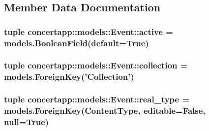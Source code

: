 \subsection{Member Data Documentation}
\hypertarget{classconcertapp_1_1models_1_1_event_a6d8e5e726942e88d3380d90d1aff01a1}{
\subsubsection[{active}]{\setlength{\rightskip}{0pt plus 5cm}tuple {\bf concertapp::models::Event::active} = models.BooleanField(default=True)}}
\label{classconcertapp_1_1models_1_1_event_a6d8e5e726942e88d3380d90d1aff01a1}
\hypertarget{classconcertapp_1_1models_1_1_event_af9838ff8a95204a05e4ab4d9af554de4}{
\subsubsection[{collection}]{\setlength{\rightskip}{0pt plus 5cm}tuple {\bf concertapp::models::Event::collection} = models.ForeignKey('{\bf Collection}')}}
\label{classconcertapp_1_1models_1_1_event_af9838ff8a95204a05e4ab4d9af554de4}
\hypertarget{classconcertapp_1_1models_1_1_event_a09aa543cdca26eb385fbf2fa2a2ffa53}{
\subsubsection[{real\_\-type}]{\setlength{\rightskip}{0pt plus 5cm}tuple {\bf concertapp::models::Event::real\_\-type} = models.ForeignKey(ContentType, editable=False, null=True)}}
\label{classconcertapp_1_1models_1_1_event_a09aa543cdca26eb385fbf2fa2a2ffa53}
\hypertarget{classconcertapp_1_1models_1_1_event_abf8022ffd48de8f0c571618d2f400a40}{
\subsubsection[{real\_\-type}]{}}
